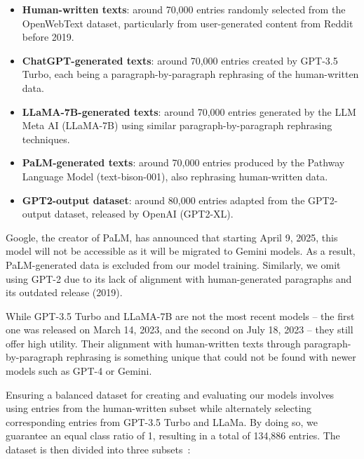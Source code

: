 \vspace{3mm}

\begin{itemize}
    \item  \textbf{Human-written texts}: around 70,000 entries randomly selected from the OpenWebText dataset, particularly from user-generated content from Reddit before 2019.
    \item \textbf{ChatGPT-generated texts}: around 70,000 entries created by GPT-3.5 Turbo, each being a paragraph-by-paragraph rephrasing of the human-written data.
    \item \textbf{LLaMA-7B-generated texts}: around 70,000 entries generated by the LLM Meta AI (LLaMA-7B) using similar paragraph-by-paragraph rephrasing techniques.
    \item \textbf{PaLM-generated texts}: around 70,000 entries produced by the Pathway Language Model (text-bison-001), also rephrasing human-written data.
    \item \textbf{GPT2-output dataset}: around 80,000 entries adapted from the GPT2-output dataset, released by OpenAI (GPT2-XL).
\end{itemize}

\vspace{3mm}

Google, the creator of PaLM, has announced that starting April 9, 2025, this model will not be accessible as it will be migrated to Gemini models. As a result, PaLM-generated data is excluded from our model training. Similarly, we omit using GPT-2 due to its lack of alignment with human-generated paragraphs and its outdated release (2019).

\vspace{3mm}

While GPT-3.5 Turbo and LLaMA-7B are not the most recent models -- the first one was released on March 14, 2023, and the second on July 18, 2023 -- they still offer high utility. Their alignment with human-written texts through paragraph-by-paragraph rephrasing is something unique that could not be found with newer models such as GPT-4 or Gemini.

\vspace{3mm}

Ensuring a balanced dataset for creating and evaluating our models involves using entries from the human-written subset while alternately selecting corresponding entries from GPT-3.5 Turbo and LLaMa. By doing so, we guarantee an equal class ratio of 1, resulting in a total of 134,886 entries. The dataset is then divided into three subsets~\cite{borovicka2012selecting}:

